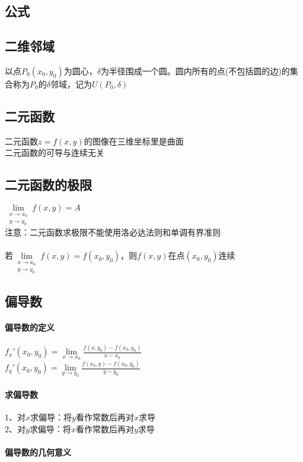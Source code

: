 \documentclass{article}
\begin{document}
\begin{flushleft}
	\LARGE
	
	\section{公式}

	\subsection{二维邻域}
	以点$P_0(x_0,y_0)$为圆心，$\delta$为半径围成一个圆。圆内所有的点(不包括圆的边)的集合称为$P_0$的$\delta$邻域，记为$U(P_0,\delta)$\\
	
	\subsection{二元函数}
	二元函数$z=f(x,y)$的图像在三维坐标里是曲面\\
	二元函数的可导与连续无关\\
	
	\subsection{二元函数的极限}
	$\lim\limits_{\substack{x\to x_0\\ y\to y_0}}f(x,y)=A$\\
	注意：二元函数求极限不能使用洛必达法则和单调有界准则\\
	~\\
	若$\lim\limits_{\substack{x\to x_0\\ y\to y_0}}f(x,y)=f(x_0,y_0)$，则$f(x,y)$在点$(x_0,y_0)$连续\\
	
	\subsection{偏导数}
	\paragraph{偏导数的定义}
	$f_x'(x_0,y_0)=\lim\limits_{x\to x_0}\frac{f(x,y_0)-f(x_0,y_0)}{x-x_0}$\\
	$f_y'(x_0,y_0)=\lim\limits_{y\to y_0}\frac{f(x_0,y)-f(x_0,y_0)}{y-y_0}$\\
	
	\paragraph{求偏导数}
	1、对$x$求偏导：将$y$看作常数后再对$x$求导\\
	2、对$y$求偏导：将$x$看作常数后再对$y$求导\\
	
	\paragraph{偏导数的几何意义}
	
	
\end{flushleft}
\end{document}
